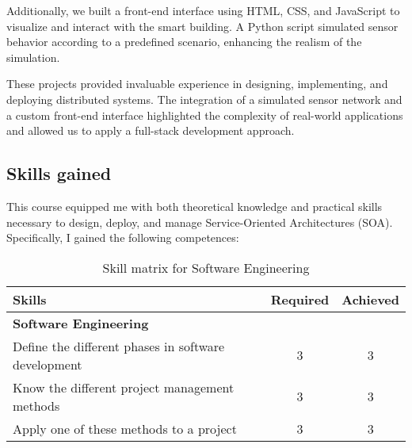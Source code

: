 \noindent Additionally, we built a front-end interface using HTML, CSS, and JavaScript to visualize and interact with the smart building. A Python script simulated sensor behavior according to a predefined scenario, enhancing the realism of the simulation.
\vspace{0.25cm}

These projects provided invaluable experience in designing, implementing, and deploying distributed systems. The integration of a simulated sensor network and a custom front-end interface highlighted the complexity of real-world applications and allowed us to apply a full-stack development approach.

\subsection{Skills gained}
\indent \indent This course equipped me with both theoretical knowledge and practical skills necessary to design, deploy, and manage Service-Oriented Architectures (SOA). Specifically, I gained the following competences:

\begin{table}[h!]
    \centering
    \renewcommand{\arraystretch}{1.5} %
    \begin{tabular}{|p{11cm}|c|c|}
    \hline
    \rowcolor[gray]{0.8}
    \textbf{Skills} & \textbf{Required} & \textbf{Achieved} \\ \hline
    \rowcolor[gray]{0.9} \textbf{Software Engineering} &  &  \\ \hline
    Define the different phases in software development & 3 & 3 \\ \hline
    Know the different project management methods & 3 & 3 \\ \hline
    Apply one of these methods to a project & 3 & 3 \\ \hline
    \end{tabular}
    \caption{Skill matrix for Software Engineering}
    \label{table:skills-software-engineering}
\end{table}

